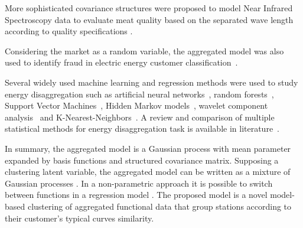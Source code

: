 More sophisticated covariance structures were proposed to model Near Infrared Spectroscopy data to evaluate meat quality based on the separated wave length according to quality specifications \cite{dias2013hierarchical,dias2015aggregated}.

Considering the market as a random variable, the aggregated model was also used to identify fraud in electric energy customer classification~\cite{lenzi2017analysis}.

Several widely used machine learning and regression methods were used to study energy disaggregation such as artificial neural networks~\cite{lin2015advanced,hosseini2017non}, random forests~\cite{bilski2017generalized,schirmer2019integration}, Support Vector Machines~\cite{basu2014nonintrusive,schirmer2020energy}, Hidden Markov models~\cite{de2014switching}, wavelet component analysis~\cite{zhu2014load} and K-Nearest-Neighbors~\cite{kim2014electrical}. A review and comparison of multiple statistical methods for energy disaggregation task is available in literature~\cite{schirmer2019evaluation}.

In summary, the aggregated model is a Gaussian process with mean parameter expanded by basis functions and structured covariance matrix. Supposing a clustering latent variable, the aggregated model can be written as a mixture of Gaussian processes \cite{shi2005hierarchical,shi2011gaussian,tresp2001mixtures}. In a non-parametric approach it is possible to switch between functions in a regression model \cite{de2014switching,de2017switching}. The proposed model is a novel model-based clustering of aggregated functional data that group stations according to their customer's typical curves similarity.




